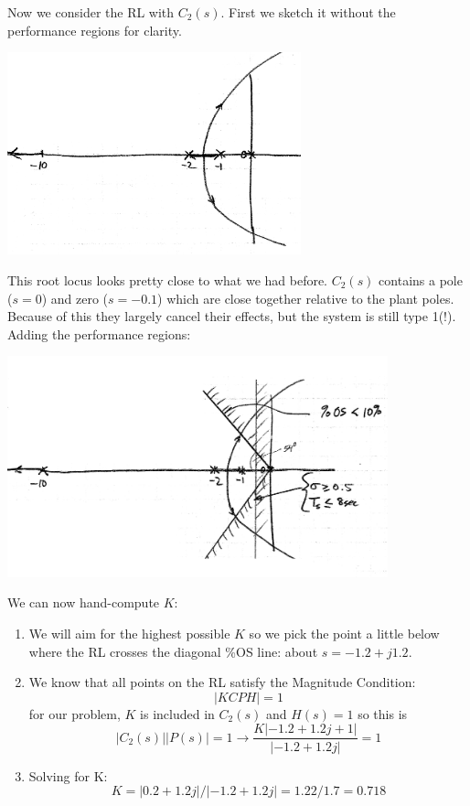 \begin{ExampleCont}
Now we consider the RL with $C_2(s)$.   First we sketch it without
the performance regions for clarity.

\includegraphics[width=85mm]{figs09/01109.png}

This root locus looks pretty close to what we had before.
 $C_2(s)$ contains a pole ($s=0$) and zero ($s=-0.1$) which are close together relative to the plant poles.  Because
 of this they largely cancel their effects, but the system is still type 1(!).  Adding the performance regions:

 \includegraphics[width=110mm]{figs09/01110.png}

 We can now hand-compute $K$:

 \begin{enumerate}
   \item We will aim for the highest possible $K$ so we pick the point a little below where the RL crosses the diagonal \%OS line:
   about $s = -1.2+j1.2$.
   \item We know that all points on the RL satisfy the Magnitude Condition:
   \[
   |KCPH| = 1
   \]
   for our problem, $K$ is included in $C_2(s)$ and $H(s) =1$  so this is
   \[
   |C_2(s)||P(s)| = 1 \to  \frac   {K|-1.2+1.2j+1|} {|-1.2+1.2j|} = 1
   \]
   \item Solving for K:
   \[
   K = |0.2+1.2j|/|-1.2+1.2j| = 1.22/1.7 = 0.718
   \]

 \end{enumerate}
\end{ExampleCont}

